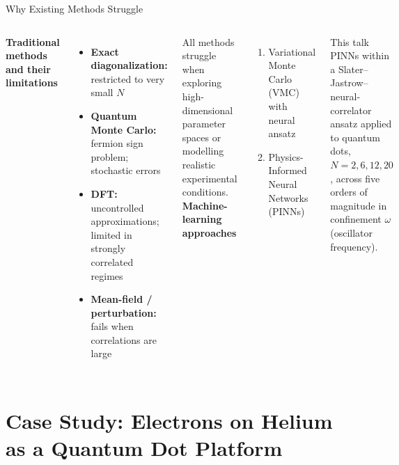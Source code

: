 \documentclass[aspectratio=169,10pt]{beamer}
\begin{document}
\begin{frame}{Why Existing Methods Struggle}
  \begin{columns}[T]
      \textbf{Traditional methods and their limitations}
      \begin{itemize}
        \item \textbf{Exact diagonalization:} restricted to very small $N$
        \item \textbf{Quantum Monte Carlo:} fermion sign problem;
              stochastic errors
        \item \textbf{DFT:} uncontrolled approximations; limited in
              strongly correlated regimes
        \item \textbf{Mean-field / perturbation:} fails when correlations
              are large
      \end{itemize}
      \vspace{0.3cm}
      All methods struggle when exploring high-dimensional parameter
      spaces or modelling realistic experimental conditions.
      \textbf{Machine-learning approaches}
      \begin{enumerate}
        \item Variational Monte Carlo (VMC) with neural ansatz
        \item \alert{Physics-Informed Neural Networks (PINNs)}
      \end{enumerate}
      \vspace{0.4cm}
      \begin{block}{This talk}
        PINNs within a Slater--Jastrow--neural-correlator ansatz applied
        to quantum dots, $N = 2, 6, 12, 20$, across five orders of
        magnitude in confinement $\omega$ (oscillator frequency).
      \end{block}
  \end{columns}
\end{frame}





\section{Case Study: Electrons on Helium as a Quantum Dot Platform}
\end{document}

